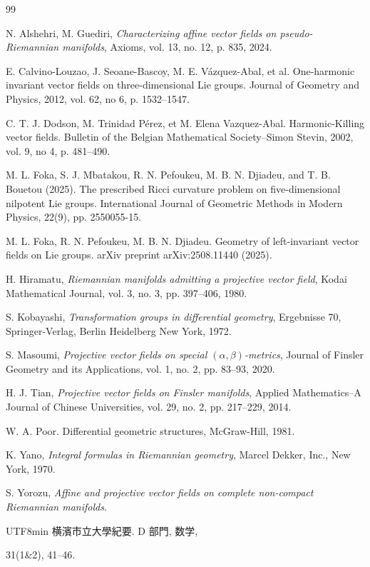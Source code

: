 \documentclass[10pt]{article}
\begin{document}
\begin{thebibliography}{99}

 N. Alshehri, M. Guediri, \textit{Characterizing affine vector fields on pseudo-Riemannian manifolds}, Axioms, vol. 13, no. 12, p. 835, 2024.

 E. Calvino-Louzao, J. Seoane-Bascoy, M. E. Vázquez-Abal, et al.  
One-harmonic invariant vector fields on three-dimensional Lie groups.  
Journal of Geometry and Physics, 2012, vol. 62, no 6, p. 1532–1547.

 C. T. J. Dodson, M. Trinidad Pérez, et M. Elena Vazquez-Abal.  
Harmonic-Killing vector fields.  
Bulletin of the Belgian Mathematical Society–Simon Stevin, 2002, vol. 9, no 4, p. 481–490.

 M. L. Foka, S. J. Mbatakou, R. N. Pefoukeu, M. B. N. Djiadeu, and T. B. Bouetou (2025).  
The prescribed Ricci curvature problem on five-dimensional nilpotent Lie groups.  
International Journal of Geometric Methods in Modern Physics, 22(9), pp. 2550055-15.

 M. L. Foka, R. N. Pefoukeu, M. B. N. Djiadeu.  
Geometry of left-invariant vector fields on Lie groups.  
arXiv preprint arXiv:2508.11440 (2025).

 H. Hiramatu, \textit{Riemannian manifolds admitting a projective vector field}, Kodai Mathematical Journal, vol. 3, no. 3, pp. 397–406, 1980.

 S. Kobayashi, \textit{Transformation groups in differential geometry}, Ergebnisse 70, Springer-Verlag, Berlin Heidelberg New York, 1972.

 S. Masoumi, \textit{Projective vector fields on special \((\alpha,\beta)\)-metrics}, Journal of Finsler Geometry and its Applications, vol. 1, no. 2, pp. 83–93, 2020.

 H. J. Tian, \textit{Projective vector fields on Finsler manifolds}, Applied Mathematics–A Journal of Chinese Universities, vol. 29, no. 2, pp. 217–229, 2014.

 W. A. Poor.  
Differential geometric structures, McGraw-Hill, 1981.

 K. Yano, \textit{Integral formulas in Riemannian geometry}, Marcel Dekker, Inc., New York, 1970.

 S. Yorozu, \textit{Affine and projective vector fields on complete non-compact Riemannian manifolds}. 
\begin{CJK}{UTF8}{min}
横濱市立大學紀要. D 部門, 数学,
\end{CJK} 
31(1\&2), 41–46.

\end{thebibliography}
\end{document}
